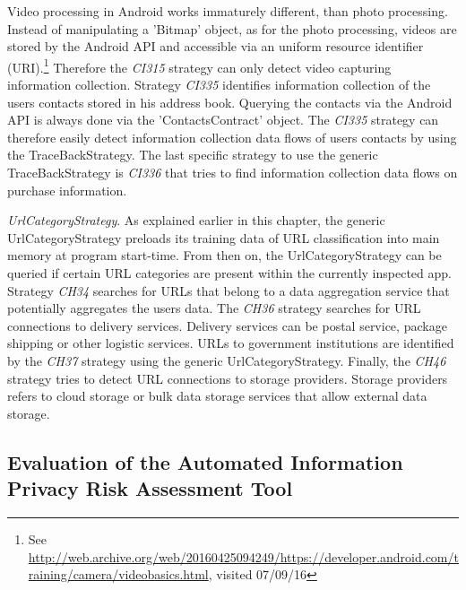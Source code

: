 Video processing in Android works immaturely different, than photo processing.
Instead of manipulating a 'Bitmap' object, as for the photo processing, videos are stored by the Android API and accessible via an uniform resource identifier (\acs{URI}).\footnote{\raggedright See \url{http://web.archive.org/web/20160425094249/https://developer.android.com/training/camera/videobasics.html}, visited 07/09/16}
Therefore the \textit{CI315} strategy can only detect video capturing information collection.
Strategy \textit{CI335} identifies information collection of the users contacts stored in his address book.
Querying the contacts via the Android API is always done via the 'ContactsContract' object.
The \textit{CI335} strategy can therefore easily detect information collection data flows of users contacts by using the TraceBackStrategy.
The last specific strategy to use the generic TraceBackStrategy is \textit{CI336} that tries to find information collection data flows on purchase information.

\textit{UrlCategoryStrategy}.
As explained earlier in this chapter, the generic UrlCategoryStrategy preloads its training data of \acs{URL} classification into main memory at program start-time.
From then on, the UrlCategoryStrategy can be queried if certain URL categories are present within the currently inspected app. 
Strategy \textit{CH34} searches for URLs that belong to a data aggregation service that potentially aggregates the users data.
The \textit{CH36} strategy searches for URL connections to delivery services.
Delivery services can be postal service, package shipping or other logistic services.
URLs to government institutions are identified by the \textit{CH37} strategy using the generic UrlCategoryStrategy.
Finally, the \textit{CH46} strategy tries to detect URL connections to storage providers.
Storage providers refers to cloud storage or bulk data storage services that allow external data storage.

\subsection{Evaluation of the Automated Information Privacy Risk Assessment Tool}\label{chapter:evaluationMethods}

